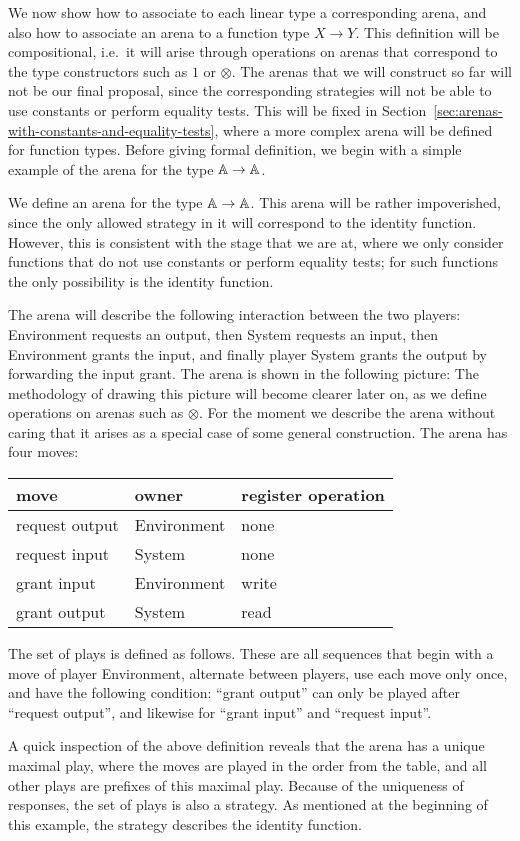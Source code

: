 We now show how to associate to each linear type a corresponding arena, and also how to associate an arena to a function type $X \to Y$. This definition will be compositional, i.e.~it will arise through operations on arenas that correspond to the type constructors such as $1$ or $\otimes$. The arenas that we will construct so far will not be our final proposal, since the corresponding strategies will not be able to use constants or perform equality tests. This will be fixed in Section~\ref{sec:arenas-with-constants-and-equality-tests}, where a more complex arena will be defined for function types. Before giving formal definition, we begin with a simple example of the arena for the type $\mathbb A \to \mathbb A$.
\begin{example}\label{ex:identity-function-without-equality-tests-and-constants}
    We define an arena for the type $\mathbb A \to \mathbb A$. This arena will be rather impoverished, since the  only allowed strategy in it will correspond to the identity function. However, this is consistent with the stage that we are at, where we only consider functions that do not use constants or perform equality tests; for such functions the only possibility is the identity function.

     The arena will describe the following interaction between the two players: Environment  requests an output,  then System requests an input, then Environment grants the input, and finally player System grants the output by forwarding the input grant. 
    The arena is shown in the following picture: 
    The methodology of drawing this picture will become clearer later on, as we define operations on arenas such as $\otimes$. For the moment we describe the arena without caring that it arises as a special case of some general construction. The arena has four moves: 
    \begin{center}
        \begin{tabular}{lll}
         move & owner & register operation \\
            \hline
            request output & Environment & none \\
            request input & System & none \\
            grant input & Environment & write \\
            grant output & System & read 
        \end{tabular}    
    \end{center}
    The set of plays is defined as follows. These are all sequences that begin with a move of player Environment, alternate between players, use each move only once, and have the following condition:  ``grant output'' can only be played after ``request output'', and likewise for ``grant input'' and ``request input''.  

    A quick inspection of the above definition reveals that the arena has a unique maximal play, where the moves are played in the order from the table, and all other plays are prefixes of this maximal play. Because of the uniqueness of responses, the set of plays is also a strategy. As mentioned at the beginning of this example, the strategy describes the identity function.  \exampleend
\end{example}

